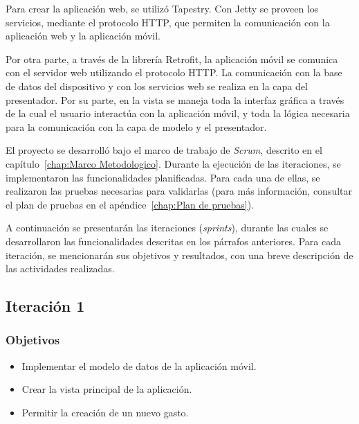 Para crear la aplicación web, se utilizó Tapestry. Con Jetty se proveen los servicios, mediante el protocolo HTTP, que permiten la comunicación con la aplicación web y la aplicación  móvil.

Por otra parte, a través de la librería Retrofit, la aplicación móvil se comunica con el servidor web utilizando el protocolo HTTP. La comunicación con la base de datos del dispositivo y con los servicios web se realiza en la capa del presentador. Por su parte, en la vista se maneja toda la interfaz gráfica a través de la cual el usuario interactúa con la aplicación móvil, y toda la lógica necesaria para la comunicación con la capa de modelo y el presentador.

El proyecto se desarrolló bajo el marco de trabajo de \textit{Scrum}, descrito en el capítulo~\ref{chap:Marco Metodologico}. Durante la ejecución de las iteraciones, se implementaron las funcionalidades planificadas. Para cada una de ellas, se realizaron las pruebas necesarias para validarlas (para más información, consultar el plan de pruebas en el apéndice~\ref{chap:Plan de pruebas}). 

A continuación se presentarán las iteraciones (\textit{sprints}), durante las cuales se desarrollaron las funcionalidades descritas en los párrafos anteriores. Para cada iteración, se mencionarán sus objetivos y resultados, con una breve descripción de las actividades realizadas.

\subsection{Iteración 1}

\subsubsection{Objetivos}
	\begin{itemize}
  \item Implementar el modelo de datos de la aplicación móvil.
	\item Crear la vista principal de la aplicación.
	\item Permitir la creación de un nuevo gasto.
	\end{itemize}

